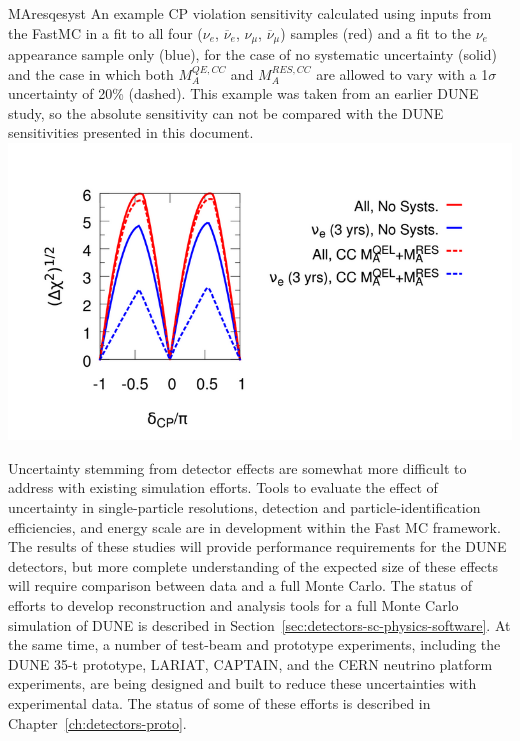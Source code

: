 \begin{cdrfigure}{MAresqesyst}{
An example CP violation sensitivity calculated using inputs from the 
  FastMC in a fit to all four ($\nu_e$, $\overline\nu_e$, $\nu_{\mu}$, 
  $\overline\nu_{\mu}$) samples (red) and a fit to the $\nu_e$ appearance sample 
  only (blue), for the case of no systematic uncertainty (solid) and the case in
  which both $M_A^{QE,CC}$ and $M_A^{RES,CC}$ are allowed to vary with a
  1$\sigma$ uncertainty of 20\% (dashed). This example was taken from an earlier
  DUNE study, so the absolute sensitivity can not be compared with the DUNE 
  sensitivities presented in this document.}
\includegraphics[width=0.8\linewidth]{volume-physics/figures/CPV_MARESQE.png}
\end{cdrfigure}

Uncertainty stemming from detector effects
are somewhat more difficult to address with existing
simulation efforts. Tools to evaluate the effect of uncertainty in single-particle resolutions,
detection and particle-identification efficiencies, and energy scale are in development within
the Fast MC framework. The results of these studies will provide performance requirements
for the DUNE detectors, but more complete understanding of the expected size of these effects
will require comparison between data and a full Monte Carlo.
The status of efforts to develop reconstruction and analysis tools for a full Monte Carlo simulation
of DUNE is described in Section~\ref{sec:detectors-sc-physics-software}. At the same time,
a number of test-beam and prototype experiments, including the DUNE 35-t prototype,
LARIAT, CAPTAIN, and the CERN neutrino platform experiments, are being designed and built to reduce these
uncertainties with experimental data. The status of some of these efforts is described in
Chapter~\ref{ch:detectors-proto}.











